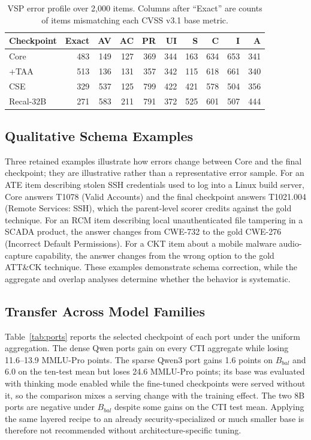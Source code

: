 \documentclass[conference]{IEEEtran}
\begin{document}
\begin{table}[t]
\caption{VSP error profile over 2,000 items. Columns after ``Exact'' are counts of items mismatching each CVSS v3.1 base metric.}
\label{tab:vsp}
\centering
\scriptsize
\setlength{\tabcolsep}{2.2pt}
\begin{tabular}{@{}lrrrrrrrrr@{}}
\toprule
Checkpoint & Exact & AV & AC & PR & UI & S & C & I & A \\
\midrule
Core & 483 & 149 & 127 & 369 & 344 & 163 & 634 & 653 & 341 \\
+TAA & 513 & 136 & 131 & 357 & 342 & 115 & 618 & 661 & 340 \\
CSE & 329 & 537 & 125 & 799 & 422 & 421 & 578 & 504 & 356 \\
Recal-32B & 271 & 583 & 211 & 791 & 372 & 525 & 601 & 507 & 444 \\
\bottomrule
\end{tabular}
\end{table}

\subsection{Qualitative Schema Examples}
Three retained examples illustrate how errors change between Core and the final checkpoint; they are illustrative rather than a representative error sample. For an ATE item describing stolen SSH credentials used to log into a Linux build server, Core answers T1078 (Valid Accounts) and the final checkpoint answers T1021.004 (Remote Services: SSH), which the parent-level scorer credits against the gold technique. For an RCM item describing local unauthenticated file tampering in a SCADA product, the answer changes from CWE-732 to the gold CWE-276 (Incorrect Default Permissions). For a CKT item about a mobile malware audio-capture capability, the answer changes from the wrong option to the gold ATT\&CK technique. These examples demonstrate schema correction, while the aggregate and overlap analyses determine whether the behavior is systematic.

\subsection{Transfer Across Model Families}
Table~\ref{tab:ports} reports the selected checkpoint of each port under the uniform aggregation. The dense Qwen ports gain on every CTI aggregate while losing 11.6--13.9 MMLU-Pro points. The sparse Qwen3 port gains 1.6 points on $B_{bal}$ and 6.0 on the ten-test mean but loses 24.6 MMLU-Pro points; its base was evaluated with thinking mode enabled while the fine-tuned checkpoints were served without it, so the comparison mixes a serving change with the training effect. The two 8B ports are negative under $B_{bal}$ despite some gains on the CTI test mean. Applying the same layered recipe to an already security-specialized or much smaller base is therefore not recommended without architecture-specific tuning.
\end{document}
